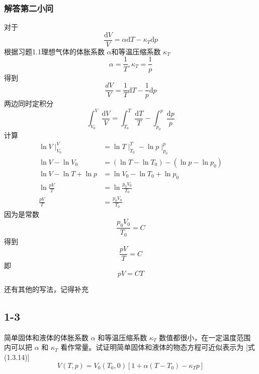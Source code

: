 \subsubsection{解答第二小问}
对于
\begin{equation}
    \frac{\mathrm{d}V}{V}=\alpha \mathrm{d}T-\kappa _T\mathrm{d}p
\end{equation}
根据习题1.1理想气体的体胀系数 $\alpha$和等温压缩系数 $\kappa_T$
\begin{equation}
    \alpha =\frac{1}{T},\kappa _T=\frac{1}{p}
\end{equation}
得到
\begin{equation}
    \frac{dV}{V}=\frac{1}{T}\mathrm{d}T-\frac{1}{p}\mathrm{d}p
\end{equation}
两边同时定积分
\begin{equation}
    \int_{V_0}^V{\frac{\mathrm{d}V}{V}}=\int_{T_0}^T{\frac{\mathrm{d}T}{T}}-\int_{p_0}^p{\frac{\mathrm{d}p}{p}}
\end{equation}
计算
\begin{equation}
    \begin{aligned}
        \ln V\mid_{V_0}^{V}&=\ln T\mid_{T_0}^{T}-\ln p\mid_{p_0}^{p}
\\
\ln V-\ln V_0&=\left( \ln T-\ln T_0 \right) -\left( \ln p-\ln p_0 \right) 
\\
\ln V-\ln T+\ln p&=\ln V_0-\ln T_0+\ln p_0
\\
\ln \frac{pV}{T}&=\ln \frac{p_0V_0}{T_0}
\\
\frac{pV}{T}&=\frac{p_0V_0}{T_0}
    \end{aligned}
\end{equation}
因为是常数
\begin{equation}
    \frac{p_0V_0}{T_0}=C
\end{equation}
得到
\begin{equation}
    \frac{pV}{T}=C
\end{equation}
即
\begin{equation}
    pV=CT
\end{equation}


还有其他的写法，记得补充



\newpage
\subsection{1-3}
简单固体和液体的体胀系数 $\alpha$ 和等温压缩系数 $\kappa_T$ 数值都很小，在一定温度范围内可以把 $\alpha$ 和 $\kappa_T$ 看作常量。试证明简单固体和液体的物态方程可近似表示为 [式 (1.3.14)]
$$V(T, p) = V_0 (T_0, 0) \left[ 1 + \alpha (T - T_0) - \kappa_T p \right]$$

